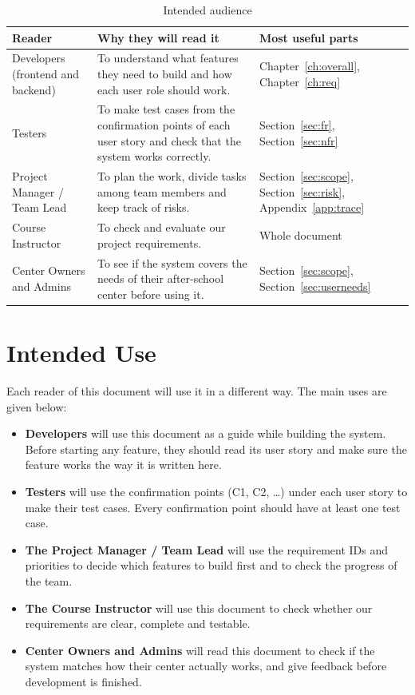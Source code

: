 \begin{table}[H]
\centering
\caption{Intended audience}\label{tab:audience}
\begin{tabularx}{\textwidth}{|L{3.8cm}|X|L{3.6cm}|}
\hline
{}\sffamily\bfseries Reader & \sffamily\bfseries Why they will read it & \sffamily\bfseries Most useful parts \\ \hline
Developers (frontend and backend) & To understand what features they need to build and how each user role should work. & Chapter~\ref{ch:overall}, Chapter~\ref{ch:req} \\ \hline
Testers & To make test cases from the confirmation points of each user story and check that the system works correctly. & Section~\ref{sec:fr}, Section~\ref{sec:nfr} \\ \hline
Project Manager / Team Lead & To plan the work, divide tasks among team members and keep track of risks. & Section~\ref{sec:scope}, Section~\ref{sec:risk}, Appendix~\ref{app:trace} \\ \hline
Course Instructor & To check and evaluate our project requirements. & Whole document \\ \hline
Center Owners and Admins & To see if the system covers the needs of their after-school center before using it. & Section~\ref{sec:scope}, Section~\ref{sec:userneeds} \\ \hline
\end{tabularx}
\end{table}

\section{Intended Use}\label{sec:use}

Each reader of this document will use it in a different way. The main uses are
given below:

\begin{itemize}
  \item \textbf{Developers} will use this document as a guide while building the
        system. Before starting any feature, they should read its user story and
        make sure the feature works the way it is written here.
  \item \textbf{Testers} will use the confirmation points (C1, C2, \ldots) under
        each user story to make their test cases. Every confirmation point should
        have at least one test case.
  \item \textbf{The Project Manager / Team Lead} will use the requirement IDs and
        priorities to decide which features to build first and to check the
        progress of the team.
  \item \textbf{The Course Instructor} will use this document to check whether our
        requirements are clear, complete and testable.
  \item \textbf{Center Owners and Admins} will read this document to check if the
        system matches how their center actually works, and give feedback before
        development is finished.
\end{itemize}

